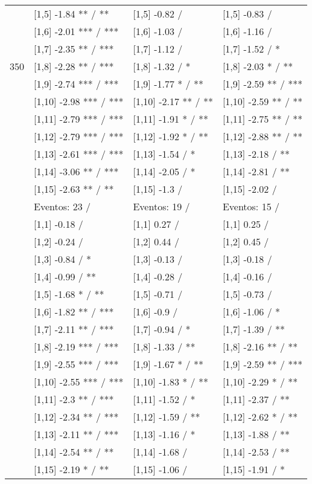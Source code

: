 \begin{table}
\begin{tabular}[t]{llll}
 & {}[1,5] -1.84 ** / ** & {}[1,5] -0.82  / & {}[1,5] -0.83  /\\
 & {}[1,6] -2.01 *** / *** & {}[1,6] -1.03  / & {}[1,6] -1.16  /\\
 & {}[1,7] -2.35 ** / *** & {}[1,7] -1.12  / & {}[1,7] -1.52  / *\\
350 & {}[1,8] -2.28 ** / *** & {}[1,8] -1.32  / * & {}[1,8] -2.03 * / **\\
\addlinespace
 & {}[1,9] -2.74 *** / *** & {}[1,9] -1.77 * / ** & {}[1,9] -2.59 ** / ***\\
 & {}[1,10] -2.98 *** / *** & {}[1,10] -2.17 ** / ** & {}[1,10] -2.59 ** / **\\
 & {}[1,11] -2.79 *** / *** & {}[1,11] -1.91 * / ** & {}[1,11] -2.75 ** / **\\
 & {}[1,12] -2.79 *** / *** & {}[1,12] -1.92 * / ** & {}[1,12] -2.88 ** / **\\
 & {}[1,13] -2.61 *** / *** & {}[1,13] -1.54  / * & {}[1,13] -2.18  / **\\
\addlinespace
 & {}[1,14] -3.06 ** / *** & {}[1,14] -2.05  / * & {}[1,14] -2.81  / **\\
 & {}[1,15] -2.63 ** / ** & {}[1,15] -1.3  / & {}[1,15] -2.02  /\\
 & Eventos:  23 / & Eventos:  19 / & Eventos:  15 /\\
 & {}[1,1] -0.18  / & {}[1,1] 0.27  / & {}[1,1] 0.25  /\\
 & {}[1,2] -0.24  / & {}[1,2] 0.44  / & {}[1,2] 0.45  /\\
\addlinespace
 & {}[1,3] -0.84  / * & {}[1,3] -0.13  / & {}[1,3] -0.18  /\\
 & {}[1,4] -0.99  / ** & {}[1,4] -0.28  / & {}[1,4] -0.16  /\\
 & {}[1,5] -1.68 * / ** & {}[1,5] -0.71  / & {}[1,5] -0.73  /\\
 & {}[1,6] -1.82 ** / *** & {}[1,6] -0.9  / & {}[1,6] -1.06  / *\\
 & {}[1,7] -2.11 ** / *** & {}[1,7] -0.94  / * & {}[1,7] -1.39  / **\\
\addlinespace
500 & {}[1,8] -2.19 *** / *** & {}[1,8] -1.33  / ** & {}[1,8] -2.16 ** / **\\
 & {}[1,9] -2.55 *** / *** & {}[1,9] -1.67 * / ** & {}[1,9] -2.59 ** / ***\\
 & {}[1,10] -2.55 *** / *** & {}[1,10] -1.83 * / ** & {}[1,10] -2.29 * / **\\
 & {}[1,11] -2.3 ** / *** & {}[1,11] -1.52  / * & {}[1,11] -2.37  / **\\
 & {}[1,12] -2.34 ** / *** & {}[1,12] -1.59  / ** & {}[1,12] -2.62 * / **\\
\addlinespace
 & {}[1,13] -2.11 ** / *** & {}[1,13] -1.16  / * & {}[1,13] -1.88  / **\\
 & {}[1,14] -2.54 ** / ** & {}[1,14] -1.68  / & {}[1,14] -2.53  / **\\
 & {}[1,15] -2.19 * / ** & {}[1,15] -1.06  / & {}[1,15] -1.91  / *\\
\bottomrule
\end{tabular}
\end{table}

